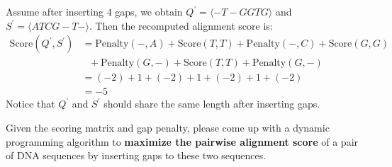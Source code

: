 Assume after inserting $4$ gaps, we obtain $Q^\prime=\langle -T-GGTG\rangle$ and $S^\prime=\langle ATCG-T-\rangle$. Then the recomputed alignment score is:
\[
	\begin{aligned}
		\text{Score}(Q^\prime, S^\prime) & = \text{Penalty}(-, A) +\text{Score}(T, T)+\text{Penalty}(-, C) + \text{Score}(G, G) \\
		                                 & \ \ \  +\text{Penalty}(G, -)+\text{Score}(T, T)+ \text{Penalty}(G, -)               \\
		                                 & = (-2)+1+(-2)+1+(-2)+1+(-2)                                                          \\
		                                 & = -5
	\end{aligned}
\]
Notice that $Q^\prime$ and $S^\prime$ should share the same length after inserting gaps.

Given the scoring matrix and gap penalty, please come up with a dynamic programming algorithm to \textbf{maximize the pairwise alignment score} of a pair of DNA sequences by inserting gaps to these two sequences.

